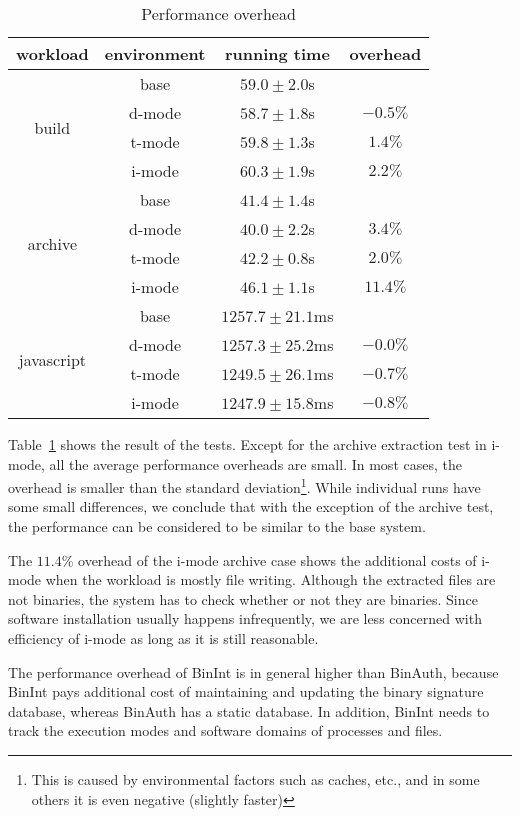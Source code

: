 \begin{table}[tb]
\centering
\begin{tabular}{|c|c|c|c|}
\hline
workload & environment & running time & overhead \\ \hline
\multirow{4}{*}{build} &
  base   & $59.0\pm2.0$s & \\
& d-mode & $58.7\pm1.8$s & $-0.5\%$ \\
& t-mode & $59.8\pm1.3$s & $1.4\%$ \\
& i-mode & $60.3\pm1.9$s & $2.2\%$ \\ \hline
\multirow{4}{*}{archive} &
  base   & $41.4\pm1.4$s & \\
& d-mode & $40.0\pm2.2$s & $3.4\%$ \\
& t-mode & $42.2\pm0.8$s & $2.0\%$ \\
& i-mode & $46.1\pm1.1$s & $11.4\%$ \\ \hline
\multirow{4}{*}{javascript} &
  base   & $1257.7\pm21.1$ms & \\
& d-mode & $1257.3\pm25.2$ms & $-0.0\%$ \\
& t-mode & $1249.5\pm26.1$ms & $-0.7\%$ \\
& i-mode & $1247.9\pm15.8$ms & $-0.8\%$ \\ \hline
\end{tabular}
\caption{Performance overhead}
\label{table:binint-benchmark}
\end{table}

Table~\ref{table:binint-benchmark} shows the result of the tests.
Except for the archive extraction test in i-mode,
all the average performance overheads are small.
In most cases, the overhead is smaller than the standard deviation\footnote{
This is caused by environmental factors such as caches, etc., and in some
others it is even negative (slightly faster)}.
While individual runs have some small differences, we conclude that
with the exception of the archive test, the performance can be considered to
be similar to the base system.

The $11.4\%$ overhead of the i-mode archive case
shows the additional costs of i-mode when the workload is mostly file writing.
Although the extracted files are not binaries, the system
has to check whether or not they are binaries.
Since software installation usually happens infrequently,
we are less concerned with efficiency of
i-mode as long as it is still reasonable.

The performance overhead of BinInt is in general higher than BinAuth,
because BinInt pays additional cost of maintaining and updating the
binary signature database, whereas BinAuth has a static database.
In addition, BinInt needs to track the execution modes and software domains
of processes and files.
